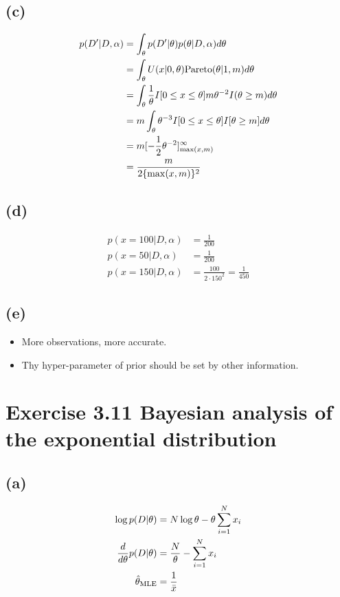 \documentclass{jsarticle}
\begin{document}
\subsection*{(c)}
\begin{align}
p(D'|D,\alpha) & = \int_{\theta}p(D'|\theta)p(\theta|D,\alpha)d\theta\\
& = \int_{\theta}U(x|0,\theta){\rm Pareto}(\theta|1,m)d\theta\\
& = \int_{\theta}\frac{1}{\theta}I[0\leq x \leq \theta]m\theta^{-2}I(\theta \geq m)d\theta \\
& = m \int_{\theta}\theta^{-3}I[0\leq x \leq \theta]I[\theta \geq m]d\theta \\
& = m[-\frac{1}{2}\theta^{-2}]_{\max(x,m)}^{\infty}\\
& = \frac{m}{2\{\max(x,m) \}^2}
\end{align}
\subsection*{(d)}
\begin{align}
p(x=100|D,\alpha) & = \frac{1}{200}\\
p(x=50|D,\alpha) & = \frac{1}{200} \\
p(x=150|D,\alpha) & = \frac{100}{2 \cdot 150^2} = \frac{1}{450}
\end{align}
\subsection*{(e)}
\begin{itemize}
	\item More observations, more accurate.
	\item Thy hyper-parameter of prior should be set by other information.
\end{itemize}

\section*{Exercise 3.11 Bayesian analysis of the exponential distribution}
\subsection*{(a)}
\begin{align}
\log p(D|\theta) & = N\log\theta - \theta \sum_{i=1}^{N}x_i \\
\frac{d}{d\theta} p(D|\theta) & = \frac{N}{\theta}-\sum_{i=1}^{N}x_i \\
\hat{\theta}_{\rm MLE} & = \frac{1}{\bar{x}}
\end{align}
\end{document}
